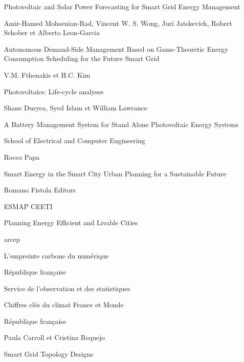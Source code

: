 \begin{thebibliography}{9}
  Photovoltaic and Solar Power Forecasting for Smart Grid Energy Management

  Amir-Hamed Mohsenian-Rad, Vincent W. S. Wong, Juri Jatskevich, Robert Schober et Alberto Leon-Garcia

  Autonomous Demand-Side Management Based on Game-Theoretic Energy Consumption Scheduling for the Future Smart Grid

  V.M. Fthenakis et H.C. Kim

  Photovoltaics: Life-cycle analyses

  \bibitem{}
  Shane Duryea, Syed Islam et William Lawrance

  A Battery Management System for Stand Alone Photovoltaic Energy Systems

  School of Electrical and Computer Engineering

  \bibitem{}
  Rocco Papa

  Smart Energy in the Smart City Urban Planning for a Sustainable Future

  Romano Fistola Editors

  \bibitem{}
  ESMAP CEETI

  Planning Energy Efficient and Livable Cities

  \bibitem{}
  arcep

  L’empreinte carbone du numérique

  République française

  \bibitem{}
  Service de l’observation et des statistiques

  Chiffres clés du climat France et Monde

  République française

  \bibitem{}
  Paula Carroll et Cristina Requejo

  Smart Grid Topology Designs
\end{thebibliography}
